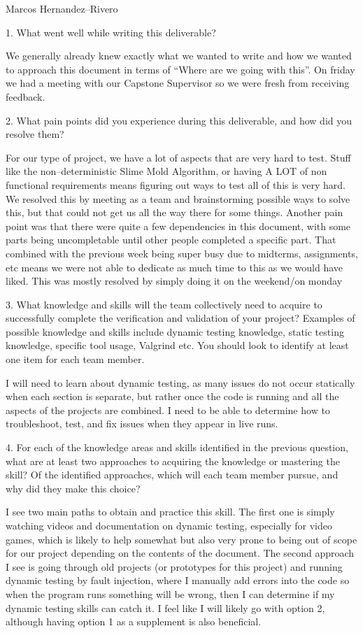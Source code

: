 \documentclass[12pt, titlepage]{article}
\begin{document}
Marcos Hernandez--Rivero

1. What went well while writing this deliverable?

We generally already knew exactly what we wanted to write and how we wanted to approach this document in terms of “Where are we going with this”. On friday we had a meeting with our Capstone Supervisor so we were fresh from receiving feedback.

2. What pain points did you experience during this deliverable, and how did you resolve them?

For our type of project, we have a lot of aspects that are very hard to test. Stuff like the non--deterministic Slime Mold Algorithm, or having A LOT of non functional requirements means figuring out ways to test all of this is very hard. We resolved this by meeting as a team and brainstorming possible ways to solve this, but that could not get us all the way there for some things. Another pain point was that there were quite a few dependencies in this document, with some parts being uncompletable until other people completed a specific part. That combined with the previous week being super busy due to midterms, assignments, etc means we were not able to dedicate as much time to this as we would have liked. This was mostly resolved by simply doing it on the weekend/on monday

3. What knowledge and skills will the team collectively need to acquire to successfully complete the verification and validation of your project? Examples of possible knowledge and skills include dynamic testing knowledge, static testing knowledge, specific tool usage, Valgrind etc. You should look to identify at least one item for each team member.

I will need to learn about dynamic testing, as many issues do not occur statically when each section is separate, but rather once the code is running and all the aspects of the projects are combined. I need to be able to determine how to troubleshoot, test, and fix issues when they appear in live runs.

4. For each of the knowledge areas and skills identified in the previous question, what are at least two approaches to acquiring the knowledge or mastering the skill? Of the identified approaches, which will each team member pursue, and why did they make this choice?

I see two main paths to obtain and practice this skill. The first one is simply watching videos and documentation on dynamic testing, especially for video games, which is likely to help somewhat but also very prone to being out of scope for our project depending on the contents of the document. The second approach I see is going through old projects (or prototypes for this project) and running dynamic testing by fault injection, where I manually add errors into the code so when the program runs something will be wrong, then I can determine if my dynamic testing skills can catch it. I feel like I will likely go with option 2, although having option 1 as a supplement is also beneficial.
\end{document}
